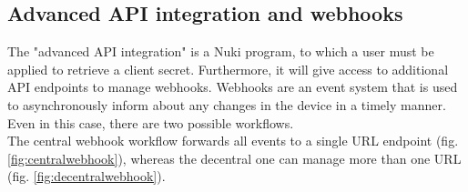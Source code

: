 \subsection{Advanced API integration and webhooks}
The "advanced API integration" is a Nuki program, to which a user must be applied to retrieve a client secret. Furthermore, it will give access to additional API endpoints to manage webhooks. Webhooks are an event system that is used to asynchronously inform about any changes in the device in a timely manner\cite{nukiwebhooksdocs}. Even in this case, there are two possible workflows.
\\ The central webhook workflow forwards all events to a single URL endpoint (fig. \ref{fig:centralwebhook}), whereas the decentral one can manage more than one URL (fig. \ref{fig:decentralwebhook}).

